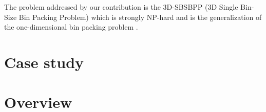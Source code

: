 The problem addressed by our contribution is the 3D-SBSBPP (3D Single Bin-Size Bin Packing Problem) which is strongly NP-hard and is the generalization of the one-dimensional bin packing problem \cite{martello2000three}.

\section*{Case study}
\label{sec:intro:case_study}%

\section*{Overview}
\label{sec:intro:overview}%